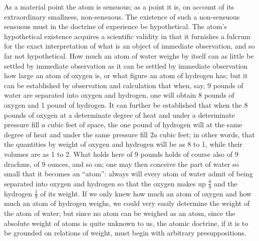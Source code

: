 \documentclass[12pt,a4paper]{book}
\begin{document}
As a material point the atom is sensuous; as a point it is, on account of its
extraordinary smallness, non-sensuous. The existence of such a non-sensuous
sensuous must in the doctrine of experience be hypothetical. The atom's
hypothetical existence acquires a scientific validity in that it furnishes a
fulcrum for the exact interpretation of what is an object of immediate
observation, and so far not hypothetical. How much an atom of water weighs by
itself can as little be settled by immediate observation as it can be settled
by immediate observation how large an atom of oxygen is, or what figure an atom
of hydrogen has; but it can be established by observation and calculation that
when, say, 9 pounds of water are separated into oxygen and hydrogen, one will
obtain 8 pounds of oxygen and 1 pound of hydrogen. It can further be
established that when the 8 pounds of oxygen at a determinate degree of heat
and under a determinate pressure fill
$a$ cubic feet of space, the one pound of hydrogen will at the same degree of
heat and under the same pressure fill $2a$ cubic feet; in other words, that the
quantities by weight of oxygen and hydrogen will be as 8 to 1, while their
volumes are as 1 to 2. What holds here of 9 pounds holds of course also of 9
drachms, of 9 ounces, and so on; one may then conceive the part of water so
small that it becomes an ``atom'': always will every atom of water admit of
being separated into oxygen and hydrogen so that the oxygen makes up
$\frac{8}{9}$ and the hydrogen $\frac{1}{9}$ of its weight. If we only knew how
much an atom of oxygen and how much an atom of hydrogen weighs, we could very
easily determine the weight of the atom of water; but since no atom can be
weighed as an atom, since the absolute weight of atoms is quite unknown to us,
the atomic doctrine, if it is to be grounded on relations of weight, must begin
with arbitrary presuppositions.
\end{document}
